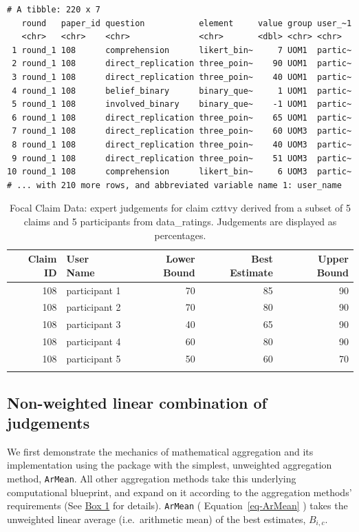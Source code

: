 \documentclass[article]{jss}
\begin{document}
\begin{verbatim}
# A tibble: 220 x 7
   round   paper_id question           element     value group user_~1
   <chr>   <chr>    <chr>              <chr>       <dbl> <chr> <chr>  
 1 round_1 108      comprehension      likert_bin~     7 UOM1  partic~
 2 round_1 108      direct_replication three_poin~    90 UOM1  partic~
 3 round_1 108      direct_replication three_poin~    40 UOM1  partic~
 4 round_1 108      belief_binary      binary_que~     1 UOM1  partic~
 5 round_1 108      involved_binary    binary_que~    -1 UOM1  partic~
 6 round_1 108      direct_replication three_poin~    65 UOM1  partic~
 7 round_1 108      direct_replication three_poin~    60 UOM3  partic~
 8 round_1 108      direct_replication three_poin~    40 UOM3  partic~
 9 round_1 108      direct_replication three_poin~    51 UOM3  partic~
10 round_1 108      comprehension      likert_bin~     6 UOM3  partic~
# ... with 210 more rows, and abbreviated variable name 1: user_name
\end{verbatim}

\hypertarget{tbl-focal-claim}{}
\begin{longtable}{rlrrr}

\toprule
Claim ID & User Name & Lower Bound & Best Estimate & Upper Bound \\ 
\midrule
108 & participant 1 & 70 & 85 & 90 \\ 
108 & participant 2 & 70 & 80 & 90 \\ 
108 & participant 3 & 40 & 65 & 90 \\ 
108 & participant 4 & 60 & 80 & 90 \\ 
108 & participant 5 & 50 & 60 & 70 \\ 
\bottomrule
\caption{\label{tbl-focal-claim}Focal Claim Data: expert judgements for claim czttvy derived from a
subset of 5 claims and 5 participants from data\_ratings. Judgements are
displayed as percentages. }\tabularnewline
\end{longtable}

\hypertarget{sec-AverageWAgg}{%
\subsection{Non-weighted linear combination of
judgements}\label{sec-AverageWAgg}}

We first demonstrate the mechanics of mathematical aggregation and its
implementation using the  package with the simplest,
unweighted aggregation method, \texttt{ArMean}. All other aggregation
methods take this underlying computational blueprint, and expand on it
according to the aggregation methods' requirements (See
\protect\hyperlink{aggWorkflow}{Box 1} for details). \texttt{ArMean} (
Equation~\ref{eq-ArMean} ) takes the unweighted linear average
(i.e.~arithmetic mean) of the best estimates, \(B_{i,c}\).
\end{document}
